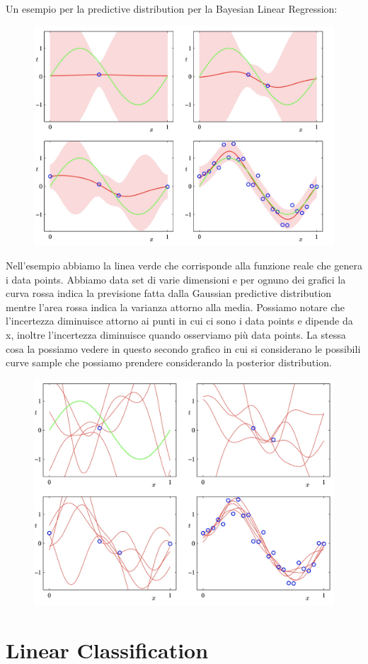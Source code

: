 \documentclass[14pt]{extreport}
\begin{document}
Un esempio per la predictive distribution per la Bayesian Linear Regression:

\begin{figure}[H]
	\centering
	\includegraphics[width=0.7\linewidth]{139.jpeg}
\end{figure}

Nell'esempio abbiamo la linea verde che corrisponde alla funzione reale che genera i data points. Abbiamo data set di varie dimensioni e per ognuno
dei grafici la curva rossa indica la previsione fatta dalla Gaussian predictive distribution mentre l'area rossa indica la varianza attorno alla
media. Possiamo notare che l'incertezza diminuisce attorno ai punti in cui ci sono i data points e dipende da x, inoltre l'incertezza diminuisce
quando osserviamo più data points. La stessa cosa la possiamo vedere in questo secondo grafico in cui si considerano le possibili curve sample che
possiamo prendere considerando la posterior distribution.
\begin{figure}[H]
	\centering
	\includegraphics[width=0.7\linewidth]{140.jpeg}
\end{figure}


\chapter{Linear Classification}
\end{document}

